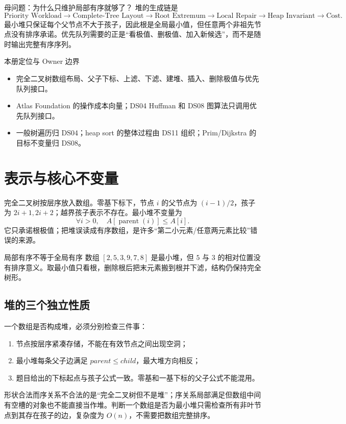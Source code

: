 \documentclass[UTF8,fontset=none,11pt,a4paper]{ctexart}
\begin{document}

\begin{corebox}{母问题：为什么只维护局部有序就够了？}
堆的生成链是
\[
\text{Priority Workload}\to\text{Complete-Tree Layout}\to\text{Root Extremum}\to\text{Local Repair}\to\text{Heap Invariant}\to\text{Cost}.
\]
最小堆只保证每个父节点不大于孩子，因此根是全局最小值，但任意两个非祖先节点没有排序承诺。优先队列需要的正是“看极值、删极值、加入新候选”，而不是随时输出完整有序序列。
\end{corebox}
\begin{methodbox}{本册定位与 Owner 边界}
\begin{itemize}
\item {}完全二叉树数组布局、父子下标、上滤、下滤、建堆、插入、删除极值与优先队列接口。
\item {}Atlas Foundation 的操作成本向量；DS04 Huffman 和 DS08 图算法只调用优先队列接口。
\item {}一般树遍历归 DS04；heap sort 的整体过程由 DS11 组织；Prim/Dijkstra 的目标不变量归 DS08。
\end{itemize}
\end{methodbox}
\tableofcontents\newpage

\section{表示与核心不变量}
完全二叉树按层序放入数组。零基下标下，节点 $i$ 的父节点为 $(i-1)/2$，孩子为 $2i+1,2i+2$；越界孩子表示不存在。最小堆不变量为
\[
\forall i>0,\quad A[\operatorname{parent}(i)]\le A[i].
\]
它只承诺根极值；把堆误读成有序数组，是许多“第二小元素/任意两元素比较”错误的来源。
\begin{examplebox}{局部有序不等于全局有序}
数组 $[2,5,3,9,7,8]$ 是最小堆，但 $5$ 与 $3$ 的相对位置没有排序意义。取最小值只看根，删除根后把末元素搬到根并下滤，结构仍保持完全树形。
\end{examplebox}

\subsection{堆的三个独立性质}
一个数组是否构成堆，必须分别检查三件事：
\begin{enumerate}
\item {}节点按层序紧凑存储，不能在有效节点之间出现空洞；
\item {}最小堆每条父子边满足 $parent\le child$，最大堆方向相反；
\item {}题目给出的下标起点与孩子公式一致。零基和一基下标的父子公式不能混用。
\end{enumerate}
形状合法而序关系不合法的是“完全二叉树但不是堆”；序关系局部满足但数组中间有空槽的对象也不能直接当作堆。判断一个数组是否为最小堆只需检查所有非叶节点到其存在孩子的边，复杂度为 $O(n)$，不需要把数组完整排序。
\end{document}
